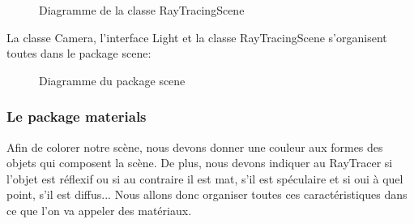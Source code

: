 \documentclass[11pt]{article}
\begin{document}
\begin{figure}[h!]
	
	\caption{Diagramme de la classe RayTracingScene}
	\label{diagrammeRayTracingScene}
\end{figure}
\FloatBarrier

La classe Camera, l'interface Light et la classe RayTracingScene s'organisent toutes dans le package scene:

\begin{figure}[h!]
	
	\caption{Diagramme du package scene}
	\label{diagrammePackageScene}
\end{figure}
\FloatBarrier

\subsubsection{Le package materials}

Afin de colorer notre scène, nous devons donner une couleur aux formes des objets qui composent la scène. De plus, nous devons indiquer au RayTracer si l'objet est réflexif ou si au contraire il est mat, s'il est spéculaire et si oui à quel point, s'il est diffus...
Nous allons donc organiser toutes ces caractéristiques dans ce que l'on va appeler des matériaux.
\end{document}
